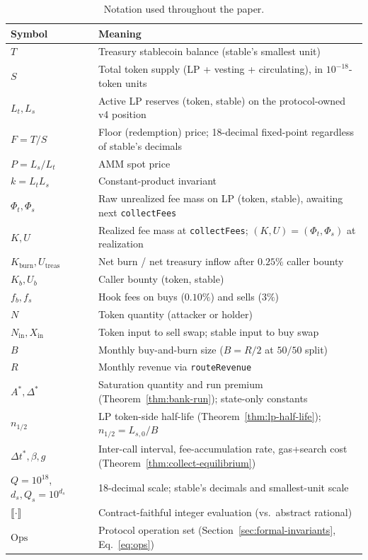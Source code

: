 \documentclass[11pt,a4paper]{article}
\theoremstyle{plain}
\theoremstyle{definition}
\theoremstyle{remark}
\newcommand{\Tres}{T}              %
\newcommand{\Sup}{S}               %
\newcommand{\Lt}{L_t}              %
\newcommand{\Ls}{L_s}              %
\newcommand{\Floor}{F}             %
\newcommand{\Spot}{P}              %
\newcommand{\kInv}{k}              %
\newcommand{\Phit}{\Phi_t}         %
\newcommand{\Phis}{\Phi_s}         %
\newcommand{\Kreal}{K}             %
\newcommand{\Ureal}{U}             %
\newcommand{\Qprec}{Q}             %
\newcommand{\dstab}{d_s}           %
\newcommand{\Qstab}{Q_s}           %
\newcommand{\contractEval}[1]{\llbracket #1 \rrbracket}  %
\begin{document}
\begin{table}[t]
\centering
\scriptsize
\setlength{\tabcolsep}{4pt}
\renewcommand{\arraystretch}{0.92}
\caption{Notation used throughout the paper.}
\label{tab:symbols}
\begin{tabular}{p{2.4cm} p{12.0cm}}
\toprule
\textbf{Symbol} & \textbf{Meaning} \\
\midrule
$\Tres$ & Treasury stablecoin balance (stable's smallest unit) \\
$\Sup$ & Total token supply (LP + vesting + circulating), in $10^{-18}$-token units \\
$\Lt, \Ls$ & Active LP reserves (token, stable) on the protocol-owned v4 position \\
$\Floor = \Tres/\Sup$ & Floor (redemption) price; 18-decimal fixed-point regardless of stable's decimals \\
$\Spot = \Ls/\Lt$ & AMM spot price \\
$\kInv = \Lt \Ls$ & Constant-product invariant \\
$\Phit, \Phis$ & Raw unrealized fee mass on LP (token, stable), awaiting next \texttt{collectFees} \\
$\Kreal, \Ureal$ & Realized fee mass at \texttt{collectFees}; $(\Kreal, \Ureal) = (\Phit, \Phis)$ at realization \\
$K_{\text{burn}}, U_{\text{treas}}$ & Net burn / net treasury inflow after $0.25\%$ caller bounty \\
$K_b, U_b$ & Caller bounty (token, stable) \\
$f_b, f_s$ & Hook fees on buys ($0.10\%$) and sells ($3\%$) \\
$N$ & Token quantity (attacker or holder) \\
$N_{\text{in}}, X_{\text{in}}$ & Token input to sell swap; stable input to buy swap \\
$B$ & Monthly buy-and-burn size ($B = R/2$ at $50/50$ split) \\
$R$ & Monthly revenue via \texttt{routeRevenue} \\
$A^*, \Delta^*$ & Saturation quantity and run premium (Theorem~\ref{thm:bank-run}); state-only constants \\
$n_{1/2}$ & LP token-side half-life (Theorem~\ref{thm:lp-half-life}); $n_{1/2} = L_{s,0}/B$ \\
$\Delta t^*, \beta, g$ & Inter-call interval, fee-accumulation rate, gas+search cost (Theorem~\ref{thm:collect-equilibrium}) \\
$\Qprec = 10^{18}$, $\dstab, \Qstab = 10^{\dstab}$ & 18-decimal scale; stable's decimals and smallest-unit scale \\
$\contractEval{\cdot}$ & Contract-faithful integer evaluation (vs.\ abstract rational) \\
$\mathrm{Ops}$ & Protocol operation set (Section~\ref{sec:formal-invariants}, Eq.~\eqref{eq:ops}) \\
\bottomrule
\end{tabular}
\end{table}
\end{document}
